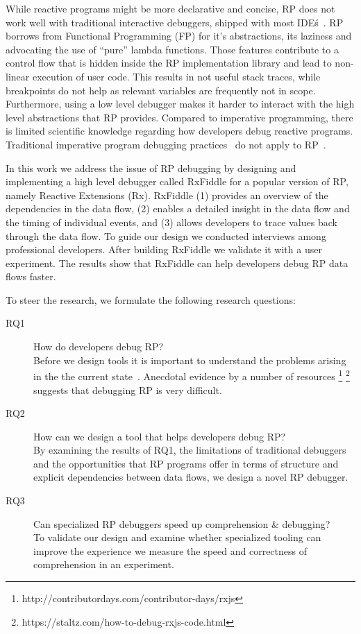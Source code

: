 While reactive programs might be more declarative and concise, RP does
not work well with traditional interactive debuggers, shipped with most
IDE\'s~\cite{salvaneschi2016debugging}.  RP borrows from Functional
Programming (FP) for it's abstractions, its laziness and advocating the
use of ``pure'' lambda functions.  Those features contribute to a
control flow that is hidden inside the RP implementation library and
lead to non-linear execution of user code.  This results in not useful
stack traces, while breakpoints do not help as relevant variables are
frequently not in scope.  Furthermore, using a low level debugger makes
it harder to interact with the high level abstractions that RP provides.
Compared to imperative programming, there is limited scientific
knowledge regarding how developers debug reactive programs.  Traditional
imperative program debugging practices~\cite{beller2017behavior} do not
apply to RP~\cite{salvaneschi2016debugging}.

In this work we address the issue of RP debugging by designing and
implementing a high level debugger called RxFiddle for a popular version
of RP, namely Reactive Extensions (Rx).  RxFiddle (1) provides an
overview of the dependencies in the data flow, (2) enables a detailed
insight in the data flow and the timing of individual events, and (3)
allows developers to trace values back through the data flow.  To guide
our design we conducted interviews among professional developers.  After
building RxFiddle we validate it with a user experiment.  The results
show that RxFiddle can help developers debug RP data flows faster.

To steer the research, we formulate the following research questions:

\begin{description}
    \item[RQ1]
        How do developers debug RP?  \\
        Before we design tools it is important to understand the
        problems arising in the the current state~\cite{singer2010examination}.
        Anecdotal evidence by a number of resources%
        \footnote{%
        \label{foot:contribdays}http://contributordays.com/contributor-days/rxjs}%
        \footnote{https://staltz.com/how-to-debug-rxjs-code.html}
        suggests that debugging RP is very difficult.

    \item[RQ2]
        How can we design a tool that helps developers debug RP?  \\
        By examining the results of RQ1, the limitations of traditional
        debuggers and the opportunities that RP programs offer in terms
        of structure and explicit dependencies between data flows, we
        design a novel RP debugger.

    \item[RQ3]
        Can specialized RP debuggers speed up comprehension \&
        debugging?  \\
        To validate our design and examine whether specialized tooling
        can improve the experience we measure the speed and correctness
        of comprehension in an experiment.

\end{description}
